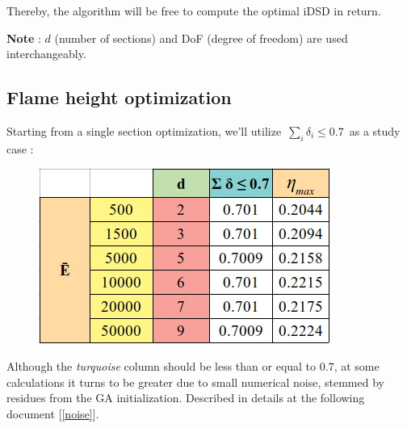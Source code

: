 \documentclass[12pt]{article}
\numberwithin{equation}{section}
\begin{document}
\begin{flushleft}
Thereby, the algorithm will be free to compute the optimal iDSD in return. 

\textbf{Note} : $d$ (number of sections) and DoF (degree of freedom) are used interchangeably.

\vspace{3cm}

\subsection{Flame height optimization}
Starting from a single section optimization, we'll utilize \,$\sum_i \delta_i \leq 0.7$\, as a study case :
\begin{figure}[H] 
\centering
\includegraphics[width=0.34 \linewidth, center]{eta_07_a.png}
\end{figure}
Although the \textit{turquoise} column should be less than or equal to $0.7$, at some calculations it turns to be greater due to small numerical noise, stemmed by residues from the GA initialization. Described in details at the following document [\ref{noise}].


\end{flushleft}
\end{document}
